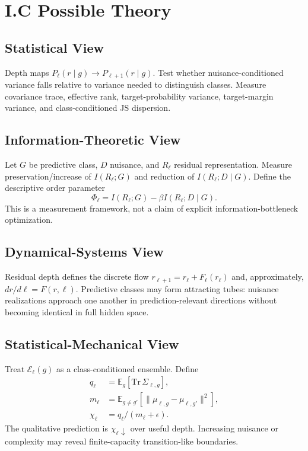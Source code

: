 \documentclass[10pt]{article}
\begin{document}
\section{I.C Possible Theory}
\subsection{Statistical View}
Depth maps $P_\ell(r\mid g)\rightarrow P_{\ell+1}(r\mid g)$. Test whether nuisance-conditioned variance falls relative to variance needed to distinguish classes. Measure covariance trace, effective rank, target-probability variance, target-margin variance, and class-conditioned JS dispersion.
\subsection{Information-Theoretic View}
Let $G$ be predictive class, $D$ nuisance, and $R_\ell$ residual representation. Measure preservation/increase of $I(R_\ell;G)$ and reduction of $I(R_\ell;D\mid G)$. Define the descriptive order parameter
\begin{equation}\Phi_\ell=I(R_\ell;G)-\beta I(R_\ell;D\mid G).\end{equation}
This is a measurement framework, not a claim of explicit information-bottleneck optimization.
\subsection{Dynamical-Systems View}
Residual depth defines the discrete flow $r_{\ell+1}=r_\ell+F_\ell(r_\ell)$ and, approximately, $dr/d\ell=F(r,\ell)$. Predictive classes may form attracting tubes: nuisance realizations approach one another in prediction-relevant directions without becoming identical in full hidden space.
\subsection{Statistical-Mechanical View}
Treat $\mathcal{E}_\ell(g)$ as a class-conditioned ensemble. Define
\begin{align}
q_\ell&=\mathbb{E}_g[\mathrm{Tr}\,\Sigma_{\ell,g}],\\
m_\ell&=\mathbb{E}_{g\neq g'}[\|\mu_{\ell,g}-\mu_{\ell,g'}\|^2],\\
\chi_\ell&=q_\ell/(m_\ell+\epsilon).
\end{align}
The qualitative prediction is $\chi_\ell\downarrow$ over useful depth. Increasing nuisance or complexity may reveal finite-capacity transition-like boundaries.
\end{document}
